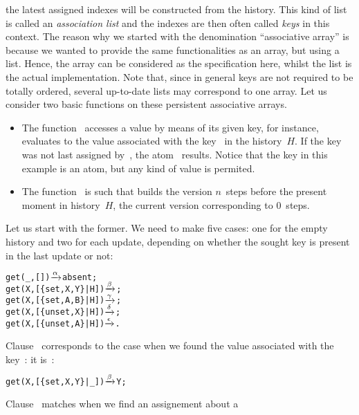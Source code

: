 the latest assigned indexes will be constructed from the history. This
kind of list is called an \emph{association list} and the indexes are
then often called \emph{keys} in this context. The reason why we
started with the denomination ``associative array'' is because we
wanted to provide the same functionalities as an array, but using a
list. Hence, the array can be considered as the specification here,
whilst the list is the actual implementation. Note that, since in
general keys are not required to be totally ordered, several
up\hyp{}to\hyp{}date lists may correspond to one array. Let us
consider two basic functions on these persistent associative arrays.
\begin{itemize}

  \item The function~ accesses a value by means of its
    given key, for instance,  evaluates to the
    value associated with the key~ in the history~\(H\). If
    the key was not last assigned by~, the
    atom~ results. Notice that the key in this example
    is an atom, but any kind of value is permited.

  \item The function~ is such that
     builds the version \(n\)~steps before
    the present moment in history~\(H\), the current version
    corresponding to \(0\)~steps.

\end{itemize}
Let us start with the former. We need to make five cases: one for the
empty history and two for each update, depending on whether the sought
key is present in the last update or not:
\begin{alltt}
get(_,           []) \(\smashedrightarrow{\alpha}\) absent;
get(X,[\{set,X,Y\}|H]) \(\smashedrightarrow{\beta}\) ;\hfill% \emph{Index found}
get(X,[\{set,A,B\}|H]) \(\smashedrightarrow{\gamma}\) ;
get(X,[\{unset,X\}|H]) \(\smashedrightarrow{\delta}\) ;\hfill% \emph{Index found}
get(X,[\{unset,A\}|H]) \(\smashedrightarrow{\epsilon}\) .
\end{alltt}
Clause~\clause{\beta} corresponds to the case when we found the value
associated with the key~: it is~:
\begin{alltt}
get(X,[\{set,X,Y\}|_]) \(\smashedrightarrow{\beta}\) Y;
\end{alltt}
Clause~\clause{\gamma} matches when we find an assignement about a
